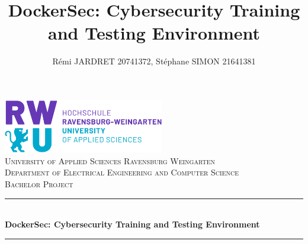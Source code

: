\documentclass[a4paper,11pt,singlespacing]{article}
\title{DockerSec: Cybersecurity Training and Testing Environment}
\author{
	Rémi JARDRET 20741372,
	Stéphane SIMON 21641381
	}
\begin{document}
\setlength{\parindent}{0ex}


\begin{titlepage}
	
	\newcommand{\HRule}{\rule{\linewidth}{0.5mm}} %
	
	\center %
	
		
	
	\includegraphics[width=7cm]{images/rwu_logo.png}\\[1.5cm] %
	
	\textsc{\LARGE University of Applied Sciences Ravensburg Weingarten}\\[1.5cm] 
	\textsc{\Large Department of
		Electrical Engineering
		and Computer Science}\\[0.5cm]
	\textsc{\large Bachelor Project}\\[0.5cm] 
	
	
	\HRule \\[0.4cm]
	{ \huge \bfseries DockerSec: Cybersecurity Training and Testing Environment}\\[0.4cm] 
	\HRule \\[3.5cm]
	
	

\end{titlepage}
\end{document}
